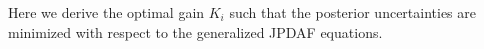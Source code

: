 \documentclass[letterpaper, 10pt, conference]{ieeeconf}
\newcommand{\bracket}[1]{\ensuremath{\left[ #1 \right]}}
\newcommand{\refeqn}[1]{(\ref{eqn:#1})}
\newcommand{\tr}[1]{\mathrm{tr}\ensuremath{\negthickspace\bracket{#1}}}
\begin{document}
%
%
Here we derive the optimal gain $K_i$ such that the posterior uncertainties are minimized with respect to the generalized JPDAF equations.
\end{document}
